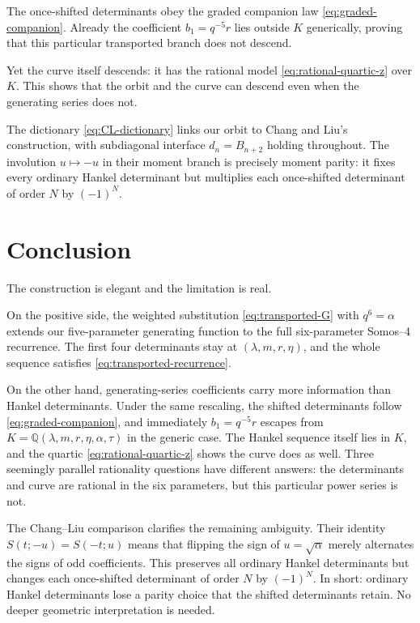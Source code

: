 \documentclass[11pt]{article}
\theoremstyle{definition}
\theoremstyle{remark}
\newcommand{\Q}{\mathbb{Q}}
\begin{document}
The once-shifted determinants obey the graded companion law
\eqref{eq:graded-companion}. Already the coefficient $b_1=q^{-5}r$ lies outside
$K$ generically, proving that this particular transported branch does not
descend.

Yet the curve itself descends: it has the rational model \eqref{eq:rational-quartic-z}
over $K$. This shows that the orbit and the curve can descend even when the
generating series does not.

The dictionary \eqref{eq:CL-dictionary} links our orbit to Chang and Liu's
construction, with subdiagonal interface $d_n=B_{n+2}$ holding throughout.
The involution $u\mapsto-u$ in their moment branch is precisely moment parity:
it fixes every ordinary Hankel determinant but multiplies each once-shifted
determinant of order $N$ by $(-1)^N$.

\section{Conclusion}
The construction is elegant and the limitation is real.

On the positive side, the weighted substitution \eqref{eq:transported-G} with
$q^6=\alpha$ extends our five-parameter generating function to the full
six-parameter Somos--4 recurrence. The first four determinants stay at
$(\lambda,m,r,\eta)$, and the whole sequence satisfies
\eqref{eq:transported-recurrence}.

On the other hand, generating-series coefficients carry more information than
Hankel determinants. Under the same rescaling, the shifted determinants follow
\eqref{eq:graded-companion}, and immediately $b_1=q^{-5}r$ escapes from
$K=\Q(\lambda,m,r,\eta,\alpha,\tau)$ in the generic case. The Hankel sequence
itself lies in $K$, and the quartic \eqref{eq:rational-quartic-z} shows the
curve does as well. Three seemingly parallel rationality questions have
different answers: the determinants and curve are rational in the six parameters,
but this particular power series is not.

The Chang--Liu comparison clarifies the remaining ambiguity. Their identity
$S(t;-u)=S(-t;u)$ means that flipping the sign of $u=\sqrt\alpha$ merely
alternates the signs of odd coefficients. This preserves all ordinary Hankel
determinants but changes each once-shifted determinant of order $N$ by
$(-1)^N$. In short: ordinary Hankel determinants lose a parity choice that the
shifted determinants retain. No deeper geometric interpretation is needed.
\end{document}
